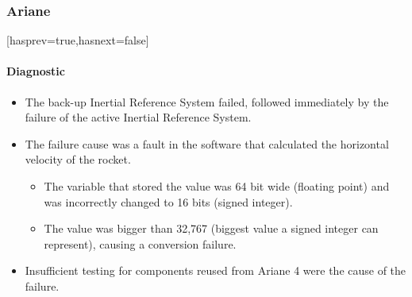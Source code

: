 \begin{frame}
\frametitle{Ariane}[hasprev=true,hasnext=false]
\framesubtitle{Diagnostic}

\begin{itemize}
	\item The back-up Inertial Reference System failed, followed immediately by
	the failure of the active Inertial Reference System.

	\item The failure cause was a fault in the software that calculated the
	horizontal velocity of the rocket.
	\begin{itemize}
		\item The variable that stored the value was 64 bit wide (floating
		point) and was incorrectly changed to 16 bits (signed integer).

		\item The value was bigger than 32,767 (biggest value a signed integer
		can represent), causing a conversion failure.
	\end{itemize}

	\item Insufficient testing for components reused from Ariane 4 were the
	cause of the failure.
\end{itemize}
\end{frame}